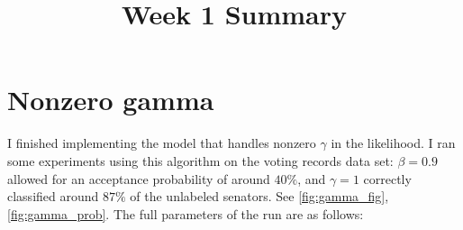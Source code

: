 \documentclass{siamart1116}
\title{Week 1 Summary}
\author{\TheAuthors}
\date{}
\begin{document}
\maketitle
\setlength{\unitlength}{1in}
\setlength{\parindent}{0in}


\section{Nonzero gamma}
I finished implementing the model that handles nonzero $\gamma$ in the likelihood. I ran some experiments using this algorithm on the voting records data set: $\beta = 0.9$ allowed for an acceptance probability of around $40\%$, and $\gamma = 1$ correctly classified around $87\%$ of the unlabeled senators. See \cref{fig:gamma_fig}, \cref{fig:gamma_prob}. The full parameters of the run are as follows:
\end{document}
